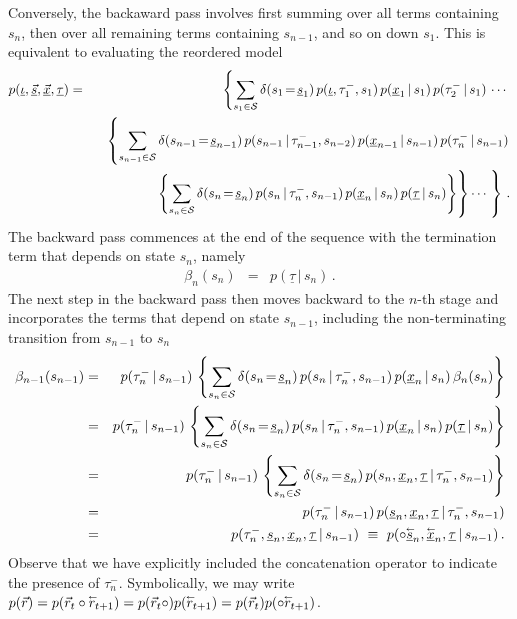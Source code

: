 \documentclass[a4paper]{article}
\newcommand{\rvec}[1]{\accentset{\leftarrow}{#1}}
\begin{document}
Conversely, the backaward pass involves first summing over all terms containing $s_n$,
then over all remaining terms containing $s_{n-1}$, and so on down $s_1$.
This is equivalent to evaluating the reordered model
\begin{eqnarray}
   p(\underline{\iota},\underline{\vec{s}},\underline{\vec{x}},\underline{\tau}) 
& = & 
   \left\{\sum_{s_1\in{\cal S}}\delta(s_1\!=\!\underline{s}_1)\,
p(\underline{\iota},\tau^-_1,s_1)\,p(\underline{x}_1\,|\,s_1)\,p(\tau^-_2\,|\,s_1)\,
\cdots\right.
\nonumber\\&&
\;\;\;\left\{\sum_{s_{n-1}\in{\cal S}}\delta(s_{n-1}\!=\!\underline{s}_{n-1})\,
p(s_{n-1}\,|\,\tau^-_{n-1},s_{n-2})\,p(\underline{x}_{n-1}\,|\,s_{n-1})\,p(\tau^-_n\,|\,s_{n-1})\right.
\nonumber\\&&
\hspace*{4mm}
\left.\rule{0pt}{7mm}\left\{\sum_{s_n\in{\cal S}}\delta(s_n\!=\!\underline{s}_n)\,
p(s_n\,|\,\tau^-_n,s_{n-1})\,p(\underline{x}_{n}\,|\,s_n)
\,p(\underline{\tau}\,|\,s_n)\right\}\right\}
\cdots\left.\rule{0pt}{7mm}\right\}
\,.
\label{eq:backward}
\end{eqnarray}
The backward pass commences at the end of the sequence with the termination term that depends on state $s_n$, namely 
\begin{eqnarray}
  \beta_n(s_n) & = & p(\underline{\tau}\,|\,s_n)\,.
\label{eq:_beta_n}
\end{eqnarray}
The next step in the backward pass then moves backward to the $n$-th stage and incorporates the terms that depend on state $s_{n-1}$, including the
non-terminating transition from $s_{n-1}$ to $s_n$
\begin{eqnarray}
  \beta_{n-1}(s_{n-1}) & = &
p(\tau^-_n\,|\,s_{n-1})\,\left\{\sum_{s_n\in{\cal S}}\delta(s_n\!=\!\underline{s}_n)\,
p(s_n\,|\,\tau^-_n,s_{n-1})\,p(\underline{x}_{n}\,|\,s_n)
\,\beta_n(s_n)\right\}
\nonumber\\&=&
p(\tau^-_n\,|\,s_{n-1})\,\left\{\sum_{s_n\in{\cal S}}\delta(s_n\!=\!\underline{s}_n)\,
p(s_n\,|\,\tau^-_n,s_{n-1})\,p(\underline{x}_{n}\,|\,s_n)
\,p(\underline{\tau}\,|\,s_n)\right\}
\nonumber\\&=&
p(\tau^-_n\,|\,s_{n-1})\,\left\{\sum_{s_n\in{\cal S}}\delta(s_n\!=\!\underline{s}_n)\,
p(s_n,\underline{x}_{n},\underline{\tau}\,|\,\tau^-_n,s_{n-1})\right\}
\nonumber\\&=&
p(\tau^-_n\,|\,s_{n-1})\,p(\underline{s}_n,\underline{x}_n,\underline{\tau}\,|\,\tau^-_n,s_{n-1})
\nonumber\\&=&
p(\tau^-_n,\underline{s}_n,\underline{x}_n,\underline{\tau}\,|\,s_{n-1})
~\equiv~p(\circ\underline{\rvec{s}}_n,\underline{\rvec{x}}_n,\underline{\tau}\,|\,s_{n-1})\,.
\end{eqnarray}
Observe that we have explicitly included the concatenation operator to indicate the presence of $\tau^-_{n}$. 
Symbolically, we may write $p(\vec{r})=p(\vec{r}_t\circ\rvec{r}_{t+1})=p(\vec{r}_t\circ)p(\rvec{r}_{t+1})=p(\vec{r}_t)p(\circ\rvec{r}_{t+1})$.
\end{document}
